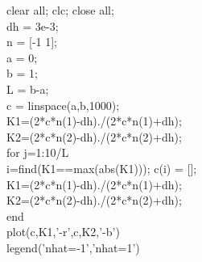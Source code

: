 \documentclass[11pt]{article}
\begin{document}
clear all; clc; close all; \\
dh = 3e-3; \\
n = [-1 1]; \\
a = 0; \\
b = 1; \\
L = b-a; \\
c = linspace(a,b,1000); \\
K1=(2*c*n(1)-dh)./(2*c*n(1)+dh); \\
K2=(2*c*n(2)-dh)./(2*c*n(2)+dh); \\
for j=1:10/L \\
  i=find(K1==max(abs(K1))); c(i) = []; \\
  K1=(2*c*n(1)-dh)./(2*c*n(1)+dh); \\
  K2=(2*c*n(2)-dh)./(2*c*n(2)+dh); \\
end \\
plot(c,K1,'-r',c,K2,'-b') \\
legend('nhat=-1','nhat=1') \\
\end{document}
